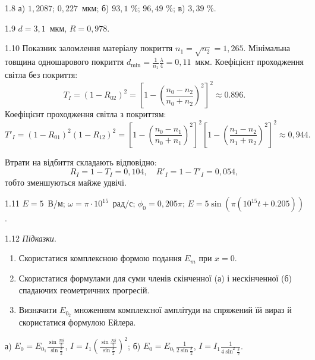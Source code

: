 \protect \section *{}
\begin{Solution}{1.{8}}
	а) $ 1,2087 $; $ 0,227 $~мкм; б) $ 93,1 $ \%; $ 96,49 $ \%; в) $ 3,39 $ \%.
\end{Solution}
\begin{Solution}{1.{9}}
    $ d =  3,1$~мкм, $ R=0,978 $.
\end{Solution}
\begin{Solution}{1.{10}}
    Показник заломлення матеріалу покриття $ n_1 = \sqrt{n_2} = 1,265  $.
    Мінімальна товщина одношарового покриття $ d_{\min} =  \frac{1}{n_1}\frac\lambda4 = 0,11$~мкм.
    Коефіцієнт проходження світла без покриття:
    \begin{equation*}
        T_I = (1 - R_{02})^2 = \left[ 1 - \left( \frac{n_0 - n_2}{n_0 + n_2}\right)^2 \right]^2 \approx 0.896.
    \end{equation*}
     Коефіцієнт проходження світла з покриттям:
     \begin{equation*}
         T'_I = (1 - R_{01})^2 (1 - R_{12})^2 = \left[ 1 - \left( \frac{n_0 - n_1}{n_0 + n_1}\right)^2 \right]^2 \left[ 1 - \left( \frac{n_1 - n_2}{n_1 + n_2}\right)^2 \right]^2 \approx 0,944.
     \end{equation*}

     Втрати на відбиття складають відповідно:
     \begin{equation*}
         R_I = 1 - T_I = 0,104, \quad R'_I = 1- T'_I = 0,054,
     \end{equation*}
     тобто зменшуються майже удвічі.
\end{Solution}
\begin{Solution}{1.{11}}
	$ E = 5 $~В/м; $\omega = \pi\cdot10^{15}$~рад/с; $\phi_0 = 0,205\pi$; $ E = 5\sin(\pi(10^{15} t + 0.205)) $.
\end{Solution}
\begin{Solution}{1.{12}}
	\emph{Підказки}.
	\begin{enumerate}
		\item  Скористатися комплексною формою подання $E_m$ при $x = 0$.
		\item  Скористатися формулами для суми членів скінченної (а) і нескінченної (б) спадаючих
		      геометричних прогресій.
		\item  Визначити $ E_{0_2} $ множенням комплексної амплітуди на спряжений їй вираз й
		      скористатися формулою Ейлера.
	\end{enumerate}
	а) $ E_0 = E_{0_1} \frac{\sin\frac{N\delta}{2}}{\sin\frac{\delta}{2}} $, $ I = I_1 \left( \frac{\sin\frac{N\delta}{2}}{\sin\frac{\delta}{2}}\right)^2 $; б) $ E_0 = E_{0_1} \frac1{2\sin\frac{\delta}{2}} $, $ I = I_1 \frac1{4\sin^2\frac{\delta}{2}} $.
\end{Solution}

